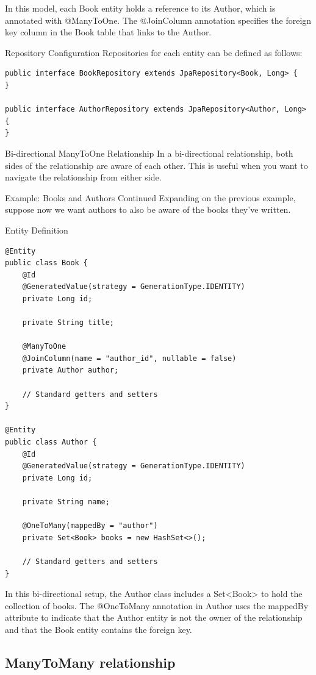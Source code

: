 In this model, each Book entity holds a reference to its Author, which is annotated with @ManyToOne. The @JoinColumn annotation specifies the foreign key column in the Book table that links to the Author.

Repository Configuration
Repositories for each entity can be defined as follows:

\begin{lstlisting}
public interface BookRepository extends JpaRepository<Book, Long> {
}

public interface AuthorRepository extends JpaRepository<Author, Long> {
}
\end{lstlisting}

Bi-directional ManyToOne Relationship
In a bi-directional relationship, both sides of the relationship are aware of each other. This is useful when you want to navigate the relationship from either side.

Example: Books and Authors Continued
Expanding on the previous example, suppose now we want authors to also be aware of the books they've written.

Entity Definition
\begin{lstlisting}
@Entity
public class Book {
    @Id
    @GeneratedValue(strategy = GenerationType.IDENTITY)
    private Long id;

    private String title;

    @ManyToOne
    @JoinColumn(name = "author_id", nullable = false)
    private Author author;

    // Standard getters and setters
}

@Entity
public class Author {
    @Id
    @GeneratedValue(strategy = GenerationType.IDENTITY)
    private Long id;

    private String name;

    @OneToMany(mappedBy = "author")
    private Set<Book> books = new HashSet<>();

    // Standard getters and setters
}
\end{lstlisting}

In this bi-directional setup, the Author class includes a Set<Book> to hold the collection of books. The @OneToMany annotation in Author uses the mappedBy attribute to indicate that the Author entity is not the owner of the relationship and that the Book entity contains the foreign key.

\subsection{ManyToMany relationship}


